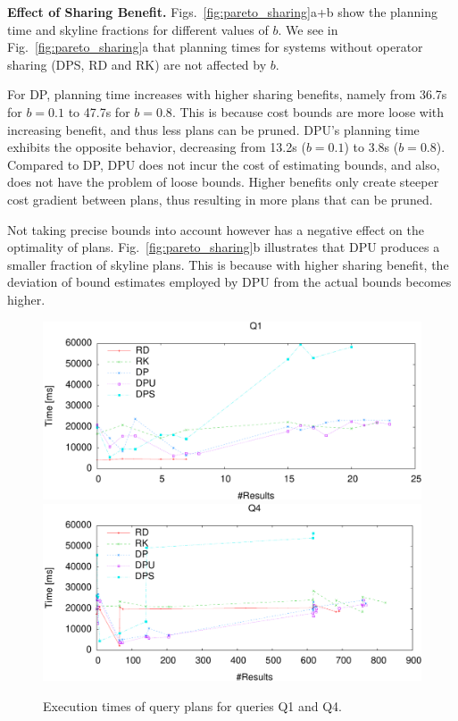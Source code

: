 \textbf{Effect of Sharing Benefit.} Figs.~\ref{fig:pareto_sharing}a+b
show the planning time and skyline fractions for different values of $b$. We see in Fig.~\ref{fig:pareto_sharing}a that planning times for systems without operator sharing (DPS, RD and RK) are not affected by $b$. 

For DP, planning time increases with higher sharing
benefits, namely from 36.7s for $b=0.1$ to 47.7s for $b=0.8$.  This is because cost bounds
are more loose with increasing benefit, and thus less plans can be pruned. 
DPU's planning time exhibits the opposite behavior, decreasing from 13.2s ($b=0.1$) to 3.8s
($b=0.8$). Compared to DP, DPU does not incur the cost of estimating bounds, and also, does not have the problem of loose bounds. Higher benefits only create steeper cost gradient
between plans, thus resulting in more plans that can be pruned.

Not taking precise bounds into account however has a negative effect on the optimality of plans. Fig.~\ref{fig:pareto_sharing}b illustrates that DPU produces a smaller fraction of skyline plans. This is because with higher sharing benefit, the deviation of bound estimates employed by DPU from the actual bounds becomes higher.  


\begin{figure}[t]
  \vspace{-0.3cm}
  \centering
  \includegraphics[width=0.82\linewidth]{figs/pareto_exec_0_q2-crop.pdf}
  \includegraphics[width=0.82\linewidth]{figs/pareto_exec_0_q19-crop.pdf}
  \caption{Execution times of query plans for queries Q1 and Q4.}
  \label{fig:exec}
  \vspace{-0.4cm}
\end{figure}



